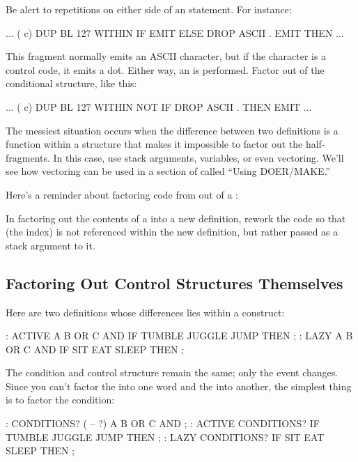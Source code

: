 Be alert to repetitions on either side of an 
statement. For instance:

\begin{Code}
... ( c)  DUP  BL 127 WITHIN
       IF  EMIT  ELSE
       DROP  ASCII . EMIT   THEN ...
\end{Code}
This fragment normally emits an ASCII character, but if the character
is a control code, it emits a dot. Either way, an  is
performed. Factor  out of the conditional structure, like
this:

\begin{Code}
... ( c)  DUP  BL 127 WITHIN NOT
       IF  DROP  ASCII .  THEN  EMIT  ...
\end{Code}
The messiest situation occurs when the difference between two
definitions is a function within a structure that makes it impossible
to factor out the half-fragments. In this case, use stack arguments,
variables, or even vectoring. We'll see how vectoring can be used in a
section of  called ``Using DOER/MAKE.''

Here's a reminder about factoring code from out of a :

\begin{tip}
In factoring out the contents of a  into a new
definition, rework the code so that  (the index) is not
referenced within the new definition, but rather passed as a stack
argument to it.
\end{tip}

\subsection{{Factoring Out Control Structures Themselves}}

Here are two definitions whose differences lies within a  construct:

\begin{Code}
: ACTIVE    A B OR  C AND  IF  TUMBLE JUGGLE JUMP THEN ;
: LAZY      A B OR  C AND  IF   SIT  EAT  SLEEP   THEN ;
\end{Code}
The condition and control structure remain the same; only the event
changes. Since you can't factor the  into one word and the
 into another, the simplest thing is to factor the
condition:

\begin{Code}
: CONDITIONS? ( -- ?) A B OR C AND ;
: ACTIVE    CONDITIONS? IF TUMBLE JUGGLE JUMP THEN ;
: LAZY      CONDITIONS? IF    SIT  EAT  SLEEP THEN ;
\end{Code}

